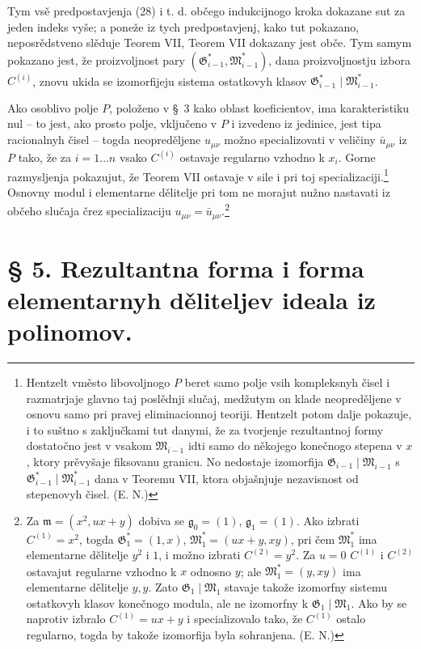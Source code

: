 \documentclass[11pt]{article}
\providecommand{\Gmod}{\mathfrak G}
\providecommand{\Mmod}{\mathfrak M}
\providecommand{\mideal}{\mathfrak m}
\providecommand{\gideal}{\mathfrak g}
\begin{document}
Tym vsě predpostavjenja (28) i t. d. občego indukcijnogo kroka dokazane sut za jeden indeks vyše; a poneže iz tych predpostavjenj, kako tut pokazano, neposrědstveno slěduje Teorem VII, Teorem VII dokazany jest obče. Tym samym pokazano jest, že proizvoljnost pary $(\Gmod^*_{i-1},\Mmod^*_{i-1})$, dana proizvoljnostju izbora $C^{(i)}$, znovu ukida se izomorfijeju sistema ostatkovyh klasov $\Gmod^*_{i-1}\mid\Mmod^*_{i-1}$.

Ako osoblivo polje $P$, položeno v §~3 kako oblast koeficientov, ima karakteristiku nul -- to jest, ako prosto polje, vključeno v $P$ i izvedeno iz jedinice, jest tipa racionalnyh čisel -- togda neopreděljene $u_{\mu\nu}$ možno specializovati v veličiny $\bar u_{\mu\nu}$ iz $P$ tako, že za $i=1\ldots n$ vsako $C^{(i)}$ ostavaje regularno vzhodno k $x_i$. Gorne razmysljenja pokazujut, že Teorem VII ostavaje v sile i pri toj specializaciji.\footnote{Hentzelt vměsto libovoljnogo $P$ beret samo polje vsih kompleksnyh čisel i razmatrjaje glavno taj poslědnji slučaj, medžutym on klade neopreděljene v osnovu samo pri pravej eliminacionnoj teoriji. Hentzelt potom dalje pokazuje, i to suštno s zaključkami tut danymi, že za tvorjenje rezultantnoj formy dostatočno jest v vsakom $\Mmod_{i-1}$ idti samo do někojego konečnogo stepena v $x$, ktory prěvyšaje fiksovanu granicu. No nedostaje izomorfija $\Gmod_{i-1}\mid\Mmod_{i-1}$ s $\Gmod^*_{i-1}\mid\Mmod^*_{i-1}$ dana v Teoremu VII, ktora objašnjuje nezavisnost od stepenovyh čisel. (E. N.)} Osnovny modul i elementarne dělitelje pri tom ne morajut nužno nastavati iz občeho slučaja črez specializaciju $u_{\mu\nu}=\bar u_{\mu\nu}$.\footnote{Za $\mideal=(x^2,ux+y)$ dobiva se $\gideal_0=(1)$, $\gideal_1=(1)$. Ako izbrati $C^{(1)}=x^2$, togda $\Gmod_1^*=(1,x)$, $\Mmod_1^*=(ux+y,xy)$, pri čem $\Mmod_1^*$ ima elementarne dělitelje $y^2$ i $1$, i možno izbrati $C^{(2)}=y^2$. Za $u=0$ $C^{(1)}$ i $C^{(2)}$ ostavajut regularne vzhodno k $x$ odnosno $y$; ale $\Mmod_1^*=(y,xy)$ ima elementarne dělitelje $y,y$. Zato $\Gmod_1\mid\Mmod_1$ stavaje takože izomorfny sistemu ostatkovyh klasov konečnogo modula, ale ne izomorfny k $\Gmod_1\mid\Mmod_1$. Ako by se naprotiv izbralo $C^{(1)}=ux+y$ i specializovalo tako, že $C^{(1)}$ ostalo regularno, togda by takože izomorfija byla sohranjena. (E. N.)}

\clearpage
\section*{§ 5. Rezultantna forma i forma elementarnyh děliteljev ideala iz polinomov.}
\end{document}
